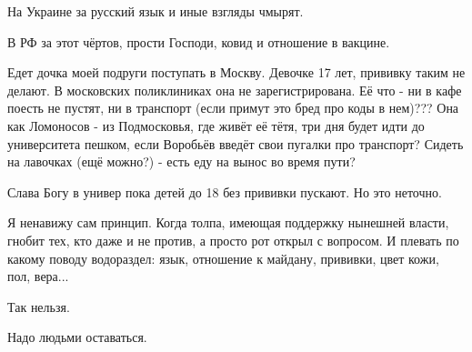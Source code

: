 На Украине за русский язык и иные взгляды чмырят. 

В РФ за этот чёртов, прости Господи, ковид и отношение в вакцине.

Едет дочка моей подруги поступать в Москву. Девочке 17 лет, прививку таким не
делают. В московских поликлиниках она не зарегистрирована. Её что - ни в кафе
поесть не пустят, ни в транспорт (если примут это бред про коды в нем)??? Она
как Ломоносов - из Подмосковья, где живёт её тётя, три дня будет идти до
университета пешком, если Воробьёв введёт свои пугалки про транспорт? Сидеть на
лавочках (ещё можно?) - есть еду на вынос во время пути? 

Слава Богу в универ пока детей до 18 без прививки пускают. Но это неточно. 

Я ненавижу сам принцип. Когда толпа, имеющая поддержку нынешней власти, гнобит
тех, кто даже и не против, а просто рот открыл с вопросом. И плевать по какому
поводу водораздел: язык, отношение к майдану, прививки, цвет кожи, пол, вера... 

Так нельзя. 

Надо людьми оставаться.

